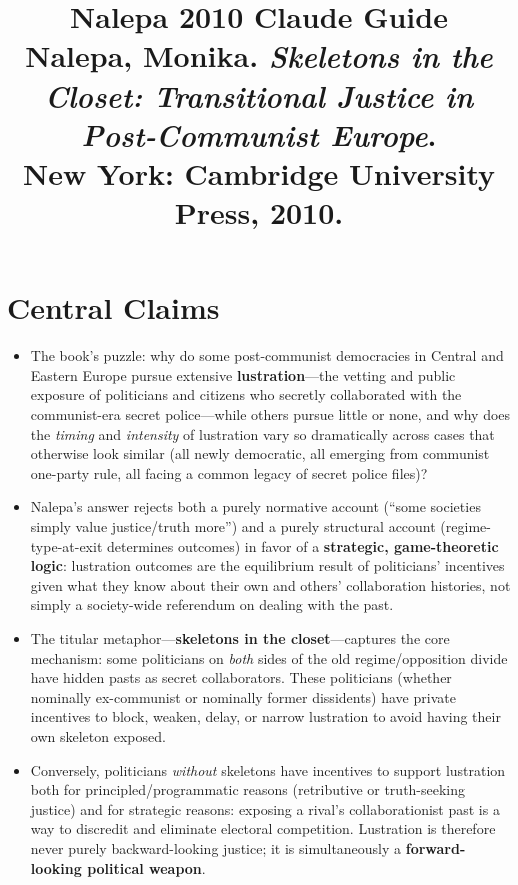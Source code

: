\documentclass[12pt]{article}
\title{\textbf{Nalepa 2010 Claude Guide}\\
\large Nalepa, Monika. \textit{Skeletons in the Closet: Transitional Justice in Post-Communist Europe}.\\
New York: Cambridge University Press, 2010.}
\author{}
\date{}
\begin{document}
\maketitle
\tableofcontents
\newpage

\section{Central Claims}

\begin{itemize}[leftmargin=*, itemsep=4pt]
    \item The book's puzzle: why do some post-communist democracies in Central and Eastern Europe pursue extensive \textbf{lustration}---the vetting and public exposure of politicians and citizens who secretly collaborated with the communist-era secret police---while others pursue little or none, and why does the \emph{timing} and \emph{intensity} of lustration vary so dramatically across cases that otherwise look similar (all newly democratic, all emerging from communist one-party rule, all facing a common legacy of secret police files)?
    \item Nalepa's answer rejects both a purely normative account (``some societies simply value justice/truth more'') and a purely structural account (regime-type-at-exit determines outcomes) in favor of a \textbf{strategic, game-theoretic logic}: lustration outcomes are the equilibrium result of politicians' incentives given what they know about their own and others' collaboration histories, not simply a society-wide referendum on dealing with the past.
    \item The titular metaphor---\textbf{skeletons in the closet}---captures the core mechanism: some politicians on \emph{both} sides of the old regime/opposition divide have hidden pasts as secret collaborators. These politicians (whether nominally ex-communist or nominally former dissidents) have private incentives to block, weaken, delay, or narrow lustration to avoid having their own skeleton exposed.
    \item Conversely, politicians \emph{without} skeletons have incentives to support lustration both for principled/programmatic reasons (retributive or truth-seeking justice) and for strategic reasons: exposing a rival's collaborationist past is a way to discredit and eliminate electoral competition. Lustration is therefore never purely backward-looking justice; it is simultaneously a \textbf{forward-looking political weapon}.

\end{itemize}
\end{document}
